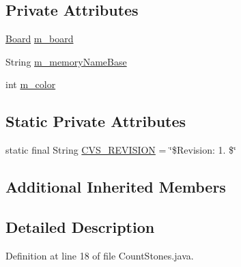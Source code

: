 \subsection*{Private Attributes}
\begin{DoxyCompactItemize}
\item 
\hyperlink{classexamples_1_1gp_1_1tictactoe_1_1_board}{Board} \hyperlink{classexamples_1_1gp_1_1tictactoe_1_1_count_stones_aeac89aba88108a9c2db1cb5a3932d6b6}{m\-\_\-board}
\item 
String \hyperlink{classexamples_1_1gp_1_1tictactoe_1_1_count_stones_aa4a0e1de59b6ed66286a931f11366006}{m\-\_\-memory\-Name\-Base}
\item 
int \hyperlink{classexamples_1_1gp_1_1tictactoe_1_1_count_stones_ae48453c32d4945018ac6ebff3923d9d8}{m\-\_\-color}
\end{DoxyCompactItemize}
\subsection*{Static Private Attributes}
\begin{DoxyCompactItemize}
\item 
static final String \hyperlink{classexamples_1_1gp_1_1tictactoe_1_1_count_stones_a5114eb2d65f8b475dc1464f03fb87df2}{C\-V\-S\-\_\-\-R\-E\-V\-I\-S\-I\-O\-N} = \char`\"{}\$Revision\-: 1. \$\char`\"{}
\end{DoxyCompactItemize}
\subsection*{Additional Inherited Members}


\subsection{Detailed Description}


Definition at line 18 of file Count\-Stones.\-java.



